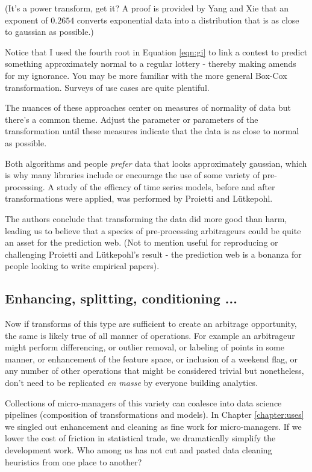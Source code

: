 (It's a power transform, get it? A proof is provided by Yang and Xie that an exponent of $0.2654$ converts exponential data into a distribution that is as close to gaussian as possible.) 

Notice that I used the fourth root in Equation \ref{eqn:gi} to link a contest to predict something approximately normal to a regular lottery - thereby making amends for my ignorance.  You may be more familiar with the more general Box-Cox transformation. Surveys of use cases are quite plentiful. 


The nuances of these approaches center on measures of normality of data but there's a common theme. Adjust the parameter or parameters of the transformation until these measures indicate that the data is as close to normal as possible. 

Both algorithms and people {\em prefer} data that looks approximately gaussian, which is why many libraries include or encourage the use of some variety of pre-processing. A study of the efficacy of time series models, before and after transformations were applied, was performed by Proietti and L\"{u}tkepohl. 

The authors conclude that transforming the data did more good than harm, leading us to believe that a species of pre-processing arbitrageurs could be quite an asset for the prediction web. (Not to mention useful for reproducing or challenging Proietti and L\"{u}tkepohl's result - the prediction web is a bonanza for people looking to write empirical papers). 

\subsection{Enhancing, splitting, conditioning ...}

Now if transforms of this type are sufficient to create an arbitrage opportunity, the same is likely true of all manner of operations. For example an arbitrageur might perform differencing, or outlier removal, or labeling of points in some manner, or enhancement of the feature space, or inclusion of a weekend flag, or any number of other operations that might be considered trivial but nonetheless, don't need to be replicated {\em en masse} by everyone building analytics. 

Collections of micro-managers of this variety can coalesce into data science pipelines (composition of transformations and models). In Chapter \ref{chapter:uses} we singled out enhancement and cleaning as fine work for micro-managers. If we lower the cost of friction in statistical trade, we dramatically simplify the development work. Who among us has not cut and pasted data cleaning heuristics from one place to another? 


